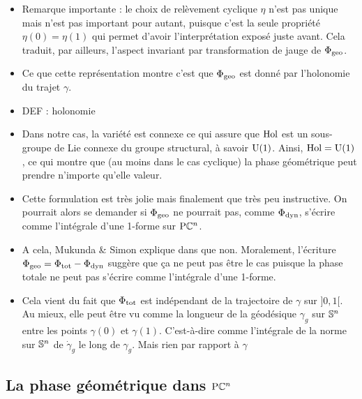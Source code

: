 \begin{itemize}
	\item Remarque importante : le choix de relèvement cyclique $\eta$ n'est pas unique mais n'est pas important pour autant, puisque c'est la seule propriété $\eta(0)=\eta(1)$ qui permet d'avoir l'interprétation exposé juste avant. Cela traduit, par ailleurs, l'aspect invariant par transformation de jauge de $\phaseg$.
	
	\item Ce que cette représentation montre c'est que $\phaseg$ est donné par l'holonomie du trajet $\gamma$.
	
	\item DEF : holonomie
	
		
	
	\item Dans notre cas, la variété est connexe ce qui assure que $\Hol$ est un sous-groupe de Lie connexe du groupe structural, à savoir $\U{1}$. Ainsi, $\Hol = \U{1}$, ce qui montre que (au moins dans le cas cyclique) la phase géométrique peut prendre n'importe qu'elle valeur.
	
	\item Cette formulation est très jolie mais finalement que très peu instructive. On pourrait alors se demander si $\phaseg$ ne pourrait pas, comme $\phased$, s'écrire comme l'intégrale d'une 1-forme sur $\PC{n}$.
	
	\item A cela, Mukunda \& Simon explique dans \cite{mukunda_quantum_1993} que non. Moralement, l'écriture $\phaseg = \phaset - \phased$ suggère que ça ne peut pas être le cas puisque la phase totale ne peut pas s'écrire comme l'intégrale d'une 1-forme.
	
	\item Cela vient du fait que $\phaset$ est indépendant de la trajectoire de $\gamma$ sur $]0,1[$. Au mieux, elle peut être vu comme la longueur de la géodésique $\gamma_g$ sur $\S{n}$ entre les points $\gamma(0)$ et $\gamma(1)$. C'est-à-dire comme l'intégrale de la norme sur $\S{n}$ de $\dot{\gamma}_g$ le long de $\gamma_g$. Mais rien par rapport à $\gamma$
	
\end{itemize}




\subsection{La phase géométrique dans $\PC{n}$}

